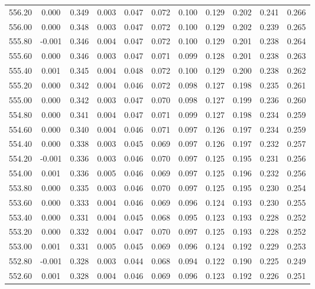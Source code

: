\begin{longtable}{cccccccccc}
    556.20 &  0.000 &  0.349 &  0.003 &  0.047 &  0.072 &  0.100 &  0.129 &  0.202 &  0.241 &  0.266 \\
    556.00 &  0.000 &  0.348 &  0.003 &  0.047 &  0.072 &  0.100 &  0.129 &  0.202 &  0.239 &  0.265 \\
    555.80 & -0.001 &  0.346 &  0.004 &  0.047 &  0.072 &  0.100 &  0.129 &  0.201 &  0.238 &  0.264 \\
    555.60 &  0.000 &  0.346 &  0.003 &  0.047 &  0.071 &  0.099 &  0.128 &  0.201 &  0.238 &  0.263 \\
    555.40 &  0.001 &  0.345 &  0.004 &  0.048 &  0.072 &  0.100 &  0.129 &  0.200 &  0.238 &  0.262 \\
    555.20 &  0.000 &  0.342 &  0.004 &  0.046 &  0.072 &  0.098 &  0.127 &  0.198 &  0.235 &  0.261 \\
    555.00 &  0.000 &  0.342 &  0.003 &  0.047 &  0.070 &  0.098 &  0.127 &  0.199 &  0.236 &  0.260 \\
    554.80 &  0.000 &  0.341 &  0.004 &  0.047 &  0.071 &  0.099 &  0.127 &  0.198 &  0.234 &  0.259 \\
    554.60 &  0.000 &  0.340 &  0.004 &  0.046 &  0.071 &  0.097 &  0.126 &  0.197 &  0.234 &  0.259 \\
    554.40 &  0.000 &  0.338 &  0.003 &  0.045 &  0.069 &  0.097 &  0.126 &  0.197 &  0.232 &  0.257 \\
    554.20 & -0.001 &  0.336 &  0.003 &  0.046 &  0.070 &  0.097 &  0.125 &  0.195 &  0.231 &  0.256 \\
    554.00 &  0.001 &  0.336 &  0.005 &  0.046 &  0.069 &  0.097 &  0.125 &  0.196 &  0.232 &  0.256 \\
    553.80 &  0.000 &  0.335 &  0.003 &  0.046 &  0.070 &  0.097 &  0.125 &  0.195 &  0.230 &  0.254 \\
    553.60 &  0.000 &  0.333 &  0.004 &  0.046 &  0.069 &  0.096 &  0.124 &  0.193 &  0.230 &  0.255 \\
    553.40 &  0.000 &  0.331 &  0.004 &  0.045 &  0.068 &  0.095 &  0.123 &  0.193 &  0.228 &  0.252 \\
    553.20 &  0.000 &  0.332 &  0.004 &  0.047 &  0.070 &  0.097 &  0.125 &  0.193 &  0.228 &  0.252 \\
    553.00 &  0.001 &  0.331 &  0.005 &  0.045 &  0.069 &  0.096 &  0.124 &  0.192 &  0.229 &  0.253 \\
    552.80 & -0.001 &  0.328 &  0.003 &  0.044 &  0.068 &  0.094 &  0.122 &  0.190 &  0.225 &  0.249 \\
    552.60 &  0.001 &  0.328 &  0.004 &  0.046 &  0.069 &  0.096 &  0.123 &  0.192 &  0.226 &  0.251 \\

\end{longtable}
